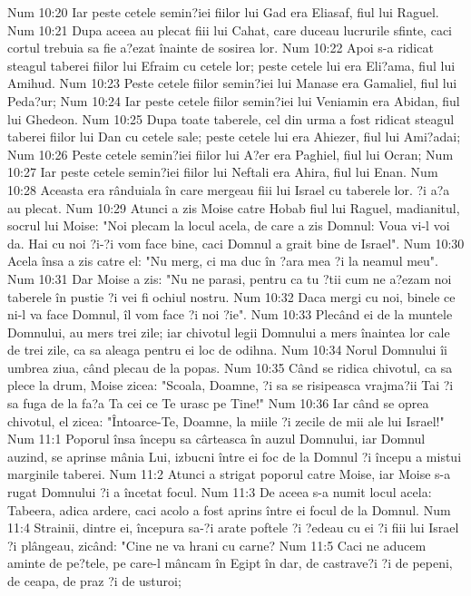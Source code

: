 Num 10:20  Iar peste cetele semin?iei fiilor lui Gad era Eliasaf, fiul lui Raguel.
Num 10:21  Dupa aceea au plecat fiii lui Cahat, care duceau lucrurile sfinte, caci cortul trebuia sa fie a?ezat înainte de sosirea lor.
Num 10:22  Apoi s-a ridicat steagul taberei fiilor lui Efraim cu cetele lor; peste cetele lui era Eli?ama, fiul lui Amihud.
Num 10:23  Peste cetele fiilor semin?iei lui Manase era Gamaliel, fiul lui Peda?ur;
Num 10:24  Iar peste cetele fiilor semin?iei lui Veniamin era Abidan, fiul lui Ghedeon.
Num 10:25  Dupa toate taberele, cel din urma a fost ridicat steagul taberei fiilor lui Dan cu cetele sale; peste cetele lui era Ahiezer, fiul lui Ami?adai;
Num 10:26  Peste cetele semin?iei fiilor lui A?er era Paghiel, fiul lui Ocran;
Num 10:27  Iar peste cetele semin?iei fiilor lui Neftali era Ahira, fiul lui Enan.
Num 10:28  Aceasta era rânduiala în care mergeau fiii lui Israel cu taberele lor. ?i a?a au plecat.
Num 10:29  Atunci a zis Moise catre Hobab fiul lui Raguel, madianitul, socrul lui Moise: "Noi plecam la locul acela, de care a zis Domnul: Voua vi-l voi da. Hai cu noi ?i-?i vom face bine, caci Domnul a grait bine de Israel".
Num 10:30  Acela însa a zis catre el: "Nu merg, ci ma duc în ?ara mea ?i la neamul meu".
Num 10:31  Dar Moise a zis: "Nu ne parasi, pentru ca tu ?tii cum ne a?ezam noi taberele în pustie ?i vei fi ochiul nostru.
Num 10:32  Daca mergi cu noi, binele ce ni-l va face Domnul, îl vom face ?i noi ?ie".
Num 10:33  Plecând ei de la muntele Domnului, au mers trei zile; iar chivotul legii Domnului a mers înaintea lor cale de trei zile, ca sa aleaga pentru ei loc de odihna.
Num 10:34  Norul Domnului îi umbrea ziua, când plecau de la popas.
Num 10:35  Când se ridica chivotul, ca sa plece la drum, Moise zicea: "Scoala, Doamne, ?i sa se risipeasca vrajma?ii Tai ?i sa fuga de la fa?a Ta cei ce Te urasc pe Tine!"
Num 10:36  Iar când se oprea chivotul, el zicea: "Întoarce-Te, Doamne, la miile ?i zecile de mii ale lui Israel!"
Num 11:1  Poporul însa începu sa cârteasca în auzul Domnului, iar Domnul auzind, se aprinse mânia Lui, izbucni între ei foc de la Domnul ?i începu a mistui marginile taberei.
Num 11:2  Atunci a strigat poporul catre Moise, iar Moise s-a rugat Domnului ?i a încetat focul.
Num 11:3  De aceea s-a numit locul acela: Tabeera, adica ardere, caci acolo a fost aprins între ei focul de la Domnul.
Num 11:4  Strainii, dintre ei, începura sa-?i arate poftele ?i ?edeau cu ei ?i fiii lui Israel ?i plângeau, zicând: "Cine ne va hrani cu carne?
Num 11:5  Caci ne aducem aminte de pe?tele, pe care-l mâncam în Egipt în dar, de castrave?i ?i de pepeni, de ceapa, de praz ?i de usturoi;
